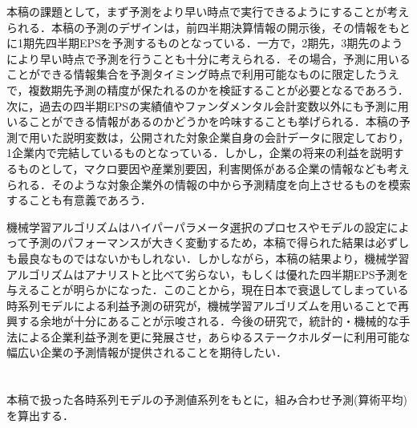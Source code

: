 \documentclass[a4paper，11pt]{jsarticle}
\begin{document}
本稿の課題として，まず予測をより早い時点で実行できるようにすることが考えられる．本稿の予測のデザインは，前四半期決算情報の開示後，その情報をもとに1期先四半期EPSを予測するものとなっている．一方で，2期先，3期先のようにより早い時点で予測を行うことも十分に考えられる．その場合，予測に用いることができる情報集合を予測タイミング時点で利用可能なものに限定したうえで，複数期先予測の精度が保たれるのかを検証することが必要となるであろう．次に，過去の四半期EPSの実績値やファンダメンタル会計変数以外にも予測に用いることができる情報があるのかどうかを吟味することも挙げられる．本稿の予測で用いた説明変数は，公開された対象企業自身の会計データに限定しており，1企業内で完結しているものとなっている．しかし，企業の将来の利益を説明するものとして，マクロ要因や産業別要因，利害関係がある企業の情報なども考えられる．そのような対象企業外の情報の中から予測精度を向上させるものを模索することも有意義であろう．

機械学習アルゴリズムはハイパーパラメータ選択のプロセスやモデルの設定によって予測のパフォーマンスが大きく変動するため，本稿で得られた結果は必ずしも最良なものではないかもしれない．しかしながら，本稿の結果より，機械学習アルゴリズムはアナリストと比べて劣らない，もしくは優れた四半期EPS予測を与えることが明らかになった．このことから，現在日本で衰退してしまっている時系列モデルによる利益予測の研究が，機械学習アルゴリズムを用いることで再興する余地が十分にあることが示唆される．今後の研究で，統計的・機械的な手法による企業利益予測を更に発展させ，あらゆるステークホルダーに利用可能な幅広い企業の予測情報が提供されることを期待したい．


\newpage
{}

% 
% 


\newpage
\appendix

\section{} \label{app:comb}
本稿で扱った各時系列モデルの予測値系列をもとに，組み合わせ予測(算術平均)を算出する．
\end{document}
